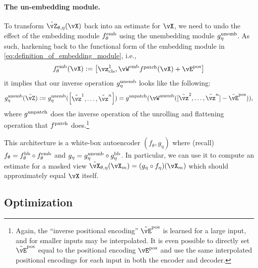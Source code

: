 \documentclass[\toplevelprefix/book-main.tex]{subfiles}
\begin{document}
\paragraph{The un-embedding module.} To transform \(\tilde{\vZ}_{\theta, \eta}(\vX)\) back into an estimate for \(\vX\), we need to undo the effect of the embedding module \(f_{\theta}^{\mathrm{emb}}\) using the unembedding module \(g_{\eta}^{\mathrm{unemb}}\). As such, harkening back to the functional form of the embedding module in \eqref{eq:definition_of_embedding_module}, i.e.,
\begin{equation}
    f_{\theta}^{\emb}(\vX) := \mat{\vz_{\cls}^{1}, \vW^{\emb}f^{\patch}(\vX) + \vE^{\pos}}
\end{equation}
it implies that our inverse operation \(g_{\eta}^{\mathrm{unemb}}\) looks like the following:
\begin{equation}
    g_{\eta}^{\unemb}(\tilde{\vZ}) := g_{\eta}^{\unemb}(\mat{\tilde{\vz}^{1}, \dots, \tilde{\vz}^{n}}) = g^{\unpatch}(\vW^{\unemb}([\tilde{\vz}^{2}, \dots, \tilde{\vz}^{n}] - \tilde{\vE}^{\pos})),
\end{equation}
where \(g^{\mathrm{unpatch}}\) does the inverse operation of the unrolling and flattening operation that \(f^{\mathrm{patch}}\) does.\footnote{Again, the ``inverse positional encoding'' \(\tilde{\vE}^{\pos}\) is learned for a large input, and for smaller inputs may be interpolated. It is even possible to directly set \(\tilde{\vE}^{\pos}\) equal to the positional encoding \(\vE^{\pos}\) and use the same interpolated positional encodings for each input in both the encoder and decoder.}

This architecture is a white-box autoencoder \((f_{\theta}, g_{\eta})\) where (recall) \(f_{\theta} = f_{\theta}^{\mathrm{bb}} \circ f_{\theta}^{\mathrm{emb}}\) and \(g_{\eta} = g_{\eta}^{\mathrm{unemb}} \circ g_{\eta}^{\mathrm{bb}}\). In particular, we can use it to compute an estimate for a masked view \(\hat{\vX}_{\theta, \eta}(\vX_{m}) = (g_{\eta} \circ f_{\eta})(\vX_{m})\) which should approximately equal \(\vX\) itself.

\subsection{Optimization}\label{sub:image_completion_optimization}
\end{document}
